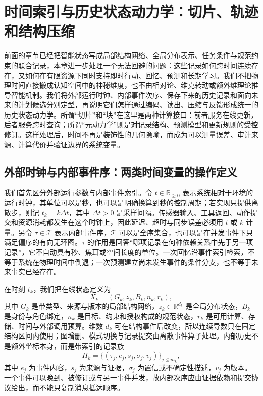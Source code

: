 \chapter{时间索引与历史状态动力学：切片、轨迹和结构压缩}

前面的章节已经把智能状态写成局部结构网络、全局分布表示、任务条件与规范约束的联合记录，本章进一步处理一个无法回避的问题：这些记录如何跨时间连续存在，又如何在有限资源下同时支持即时行动、回忆、预测和长期学习。我们不把物理时间直接搬成认知空间中的神秘维度，也不由相对论、维克转动或额外维理论推导智能机制。我们将外部运行时钟、内部事件次序、保存下来的历史记录和面向未来的计划候选分别定型，再说明它们怎样通过编码、读出、压缩与反馈形成统一的历史状态动力学。所谓“切片”和“块”在这里是两种计算接口：前者服务在线更新，后者服务跨时查询；所谓“元动力学”则是对记录结构、预测模型和更新规则的受控修订。这样处理后，时间不再是装饰性的几何隐喻，而成为可以测量误差、审计来源、计算代价并验证边界的系统变量。

\section{外部时钟与内部事件序：两类时间变量的操作定义}

我们首先区分外部运行参数与内部事件索引。令 $t\in\mathbb{R}_{\geq 0}$ 表示系统相对于环境的运行时钟，其单位可以是秒，也可以是明确换算到秒的控制周期；若实现只提供离散步，则记 $t_k=k\Delta t$，其中 $\Delta t>0$ 是采样间隔。传感器输入、工具返回、动作提交和资源消耗都发生在这个时钟上，因此延迟、超时与同步误差必须用 $t$ 或 $k$ 计量。另令 $\tau\in\mathcal{T}$ 表示内部事件序，$\mathcal{T}$ 可以是全序集合，也可以是在并发事件下只满足偏序的有向无环图。$\tau$ 的作用是回答“哪项记录在何种依赖关系中先于另一项记录”，它不自动具有秒、焦耳或空间长度的单位。一次回忆沿事件索引检索，不等于系统在物理时间中倒退；一次预测建立尚未发生事件的条件分支，也不等于未来事实已经存在。

在时刻 $t_k$，我们把在线状态定义为
\[
X_k=(G_k,z_k,B_k,n_k,r_k),
\]
其中 $G_k$ 是带类型、来源与版本的局部结构网络，$z_k\in\mathbb{R}^{d_k}$ 是全局分布状态，$B_k$ 是身份与角色绑定，$n_k$ 是目标、约束和授权构成的规范状态，$r_k$ 是可用计算、存储、时间与外部调用预算。维数 $d_k$ 可在结构事件后改变，所以连续导数只在固定结构区间内使用；图增删、模式切换与记录提交由离散事件算子处理。内部历史不是额外坐标本身，而是带索引的记录族
\[
H_k=\{(\tau_j,e_j,s_j,\sigma_j,v_j)\}_{j\leq m_k},
\]
其中 $e_j$ 为事件内容，$s_j$ 为来源与证据，$\sigma_j$ 为置信或不确定性描述，$v_j$ 为版本。一个事件可以晚到、被修订或与另一事件并发，故内部次序应由证据依赖和提交协议给出，而不能只复制消息抵达顺序。

